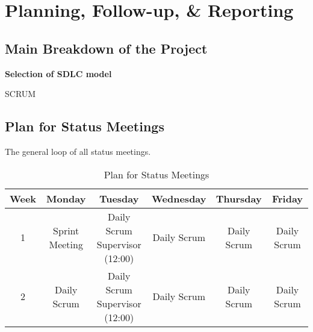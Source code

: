 \section{Planning, Follow-up, \& Reporting}
\subsection{Main Breakdown of the Project}

\textbf{Selection of SDLC model}

SCRUM \cite{scrum_guide}

\subsection{Plan for Status Meetings}
The general loop of all status meetings.
\begin{table}[H]
    \centering
    \begin{tabular}{|c|c|c|c|c|c|}
    \hline
    Week & Monday & Tuesday & Wednesday & Thursday & Friday \\
    \hline
    1 & Sprint Meeting & \makecell{Daily Scrum \\ Supervisor (12:00)} & Daily Scrum & Daily 
    Scrum & Daily Scrum \\
    \hline
    2 & Daily Scrum & \makecell{Daily Scrum \\ Supervisor (12:00)} & Daily Scrum & Daily 
    Scrum & Daily Scrum \\
    \hline
    \end{tabular}
    \caption{Plan for Status Meetings}
    \label{tab:meeting_plan}
\end{table}
